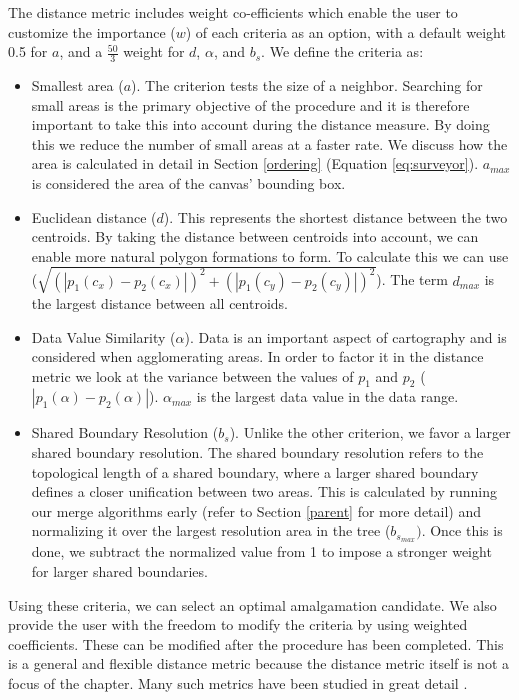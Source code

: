 The distance metric includes weight co-efficients which enable the user to customize the importance ($w$) of each criteria as an option, with a default weight 0.5 for $a$, and a $\frac{50}{3}$ weight for $d$, $\alpha$, and $b_s$.
We define the criteria as:
\begin{itemize}
\item Smallest area ($a$). The criterion tests the size of a neighbor. Searching for small areas is the primary objective of the procedure and it is therefore important to take this into account during the distance measure. By doing this we reduce the number of small areas at a faster rate. We discuss how the area is calculated in detail in Section \ref{ordering} (Equation \ref{eq:surveyor}). $a_{max}$ is considered the area of the canvas' bounding box.
\item Euclidean distance ($d$). This represents the shortest distance between the two centroids. By taking the distance between centroids into account, we can enable more natural polygon formations to form. To calculate this we can use ($\sqrt{(|p_1(c_x)-p_2(c_x)|)^2+(|p_1(c_y)-p_2(c_y)|)^2}$). The term $d_{max}$ is the largest distance between all centroids. 
\item Data Value Similarity ($\alpha$). Data is an important aspect of cartography and is considered when agglomerating areas. In order to factor it in the distance metric we look at the variance between the values of $p_1$ and $p_2$ ($|p_1(\alpha) - p_2(\alpha)|$). $\alpha_{max}$ is the largest data value in the data range.
\item Shared Boundary Resolution ($b_s$). Unlike the other criterion, we favor a larger shared boundary resolution. The shared boundary resolution refers to the topological length of a shared boundary, where a larger shared boundary defines a closer unification between two areas. This is calculated by running our merge algorithms early (refer to Section \ref{parent} for more detail) and normalizing it over the largest resolution area in the tree ($b_{s_{max}})$. Once this is done, we subtract the normalized value from 1 to impose a stronger weight for larger shared boundaries.
\end{itemize}

Using these criteria, we can select an optimal amalgamation candidate. We also provide the user with the freedom to modify the criteria by using weighted coefficients. These can be modified after the procedure has been completed. This is a general and flexible distance metric because the distance metric itself is not a focus of the chapter. Many such metrics have been studied in great detail \cite{elmqvist2010hierarchical}. %

